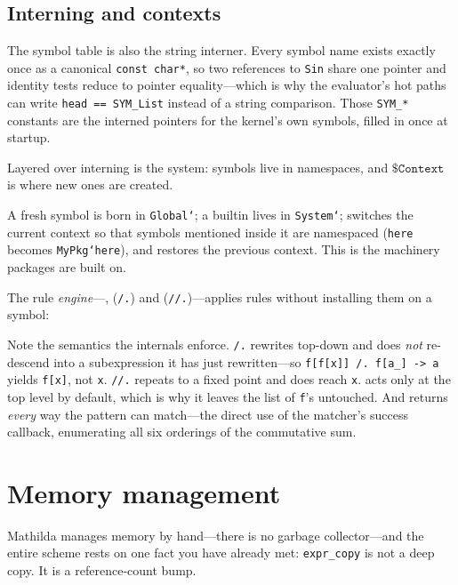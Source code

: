 \subsection*{Interning and contexts}

The symbol table is also the string interner. Every symbol name exists exactly once as
a canonical \texttt{const char*}, so two references to \texttt{Sin} share one pointer
and identity tests reduce to pointer equality---which is why the evaluator's hot paths
can write \texttt{head == SYM\_List} instead of a string comparison. Those
\texttt{SYM\_*} constants are the interned pointers for the kernel's own symbols,
filled in once at startup.

Layered over interning is the  system: symbols live in namespaces, and
\(\mathtt{\$Context}\) is where new ones are created.


A fresh symbol is born in \texttt{Global`}; a builtin lives in \texttt{System`};
 switches the current context so that symbols mentioned inside it are
namespaced (\texttt{here} becomes \texttt{MyPkg`here}), and  restores the
previous context. This is the machinery packages are built on.

The rule \emph{engine}---,  (\texttt{/.}) and
 (\texttt{//.})---applies rules without installing them on a symbol:


Note the semantics the internals enforce. \texttt{/.} rewrites top-down and does
\emph{not} re-descend into a subexpression it has just rewritten---so
\texttt{f[f[x]] /. f[a\_] -> a} yields \texttt{f[x]}, not \texttt{x}. \texttt{//.}
repeats to a fixed point and does reach \texttt{x}.  acts only at the top
level by default, which is why it leaves the list of \texttt{f}'s untouched. And
 returns \emph{every} way the pattern can match---the direct use of the
matcher's success callback, enumerating all six orderings of the commutative sum.

\section{Memory management}
\label{sec:int-memory}

Mathilda manages memory by hand---there is no garbage collector---and the entire
scheme rests on one fact you have already met: \texttt{expr\_copy} is not a deep copy.
It is a reference-count bump.

